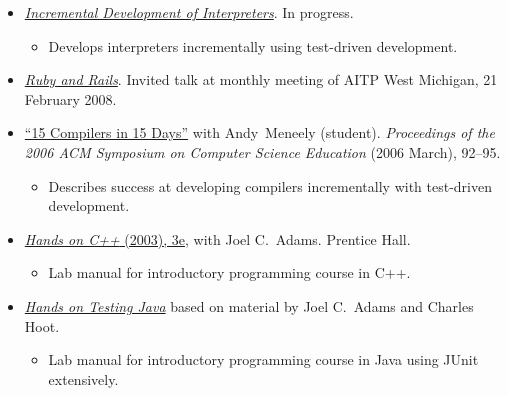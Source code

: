 \documentclass[letterpaper,10pt]{article}
\newcommand{\resitem}[1]{\vspace{-2pt} \item #1}
\begin{document}
\setlength{\parsep}{0mm}
\setlength{\topsep}{0mm}
\setlength{\itemsep}{0mm}
\begin{itemize}
	\item \href{http://cs.calvin.edu/curriculum/cs/214/jdfrens/Labs/}{\textit{Incremental Development of Interpreters}}.  In progress.
  \vspace{-1mm}
	\begin{itemize}
		\resitem{Develops interpreters incrementally using test-driven development.}
	\end{itemize}

	\item \href{http://norecess.org/frens-aitp-ruby-and-rails.pdf}{\textit{Ruby and Rails}}.  Invited talk at monthly meeting of AITP West Michigan, 21 February 2008.
	
	\item \href{http://doi.acm.org/10.1145/1121341.1121372}{``15 Compilers in 15 Days''} with Andy~Meneely (student).  \textit{Proceedings of the 2006 ACM Symposium on Computer Science Education} (2006 March), 92--95.
  \vspace{-1mm}
	  \begin{itemize}
		\resitem{Describes success at developing compilers incrementally with test-driven development.}
  	\end{itemize}
	
	\item \href{http://cs.calvin.edu/books/c++/intro/3e/HandsOnC++/}{\textit{Hands on C++} (2003), 3e}, with Joel C.\ Adams.  Prentice Hall.
  \vspace{-1mm}
	  \begin{itemize}
	    \resitem{Lab manual for introductory programming course in C++.}
	  \end{itemize}
	  
	\item \href{http://cs.calvin.edu/curriculum/cs/108/HoTJ/}{\textit{Hands on Testing Java}} based on material by Joel C.\ Adams and Charles Hoot.
  \vspace{-1mm}
	  \begin{itemize}
	    \resitem{Lab manual for introductory programming course in Java using JUnit extensively.}
	  \end{itemize}
  
\end{itemize}
\end{document}
